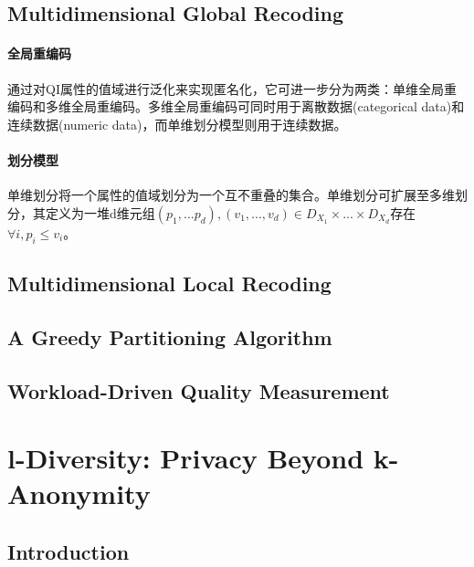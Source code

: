 \documentclass[12pt,a4paper]{article}
\begin{document}
\subsection{Multidimensional Global Recoding}
\paragraph{全局重编码} 通过对QI属性的值域进行泛化来实现匿名化，它可进一步分为两类：单维全局重编码和多维全局重编码。多维全局重编码可同时用于离散数据(categorical data)和连续数据(numeric data)，而单维划分模型则用于连续数据。
\paragraph{划分模型} 单维划分将一个属性的值域划分为一个互不重叠的集合。单维划分可扩展至多维划分，其定义为一堆d维元组$(p_1,...p_d),(v_1,...,v_d) \in D_{X_1} \times ... \times D_{X_d}$存在$ \forall i, p_i \leq v_i$。
\subsection{Multidimensional Local Recoding}

\subsection{A Greedy Partitioning Algorithm}

\subsection{Workload-Driven Quality Measurement}


























\section{l-Diversity: Privacy Beyond k-Anonymity\cite{l-diversity} }

\subsection{Introduction}
\end{document}
